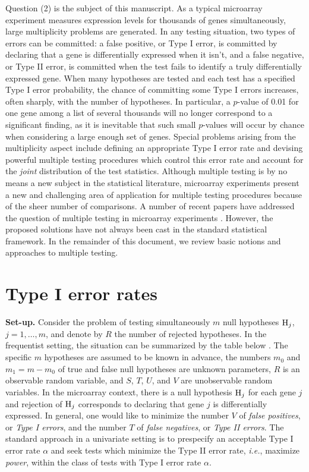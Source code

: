 \documentclass[11pt]{article}
\begin{document}
Question (2) is the subject of this manuscript. 
As a typical microarray
experiment measures expression levels for thousands of genes
simultaneously, large multiplicity problems are generated. In any
testing situation, two types of errors can be committed: a false
positive, or Type I error, is committed by declaring that a gene is
differentially expressed when it isn't, and a false negative, or Type
II error, is committed when the test fails to identify a truly
differentially expressed gene. When many hypotheses are tested and
each test has a specified Type I error probability, the chance of
committing some Type I errors increases, often sharply, with the
number of hypotheses. In particular, a $p$-value of 0.01 for one gene among a list
of several thousands will no longer correspond to a significant
finding, as it is inevitable that such small $p$-values will occur by chance when 
considering a large enough set of genes. Special problems arising from the multiplicity
aspect include defining an appropriate Type I error rate and devising
powerful multiple testing procedures which control this error rate and
account for the {\it joint} distribution of the test statistics. 
Although multiple testing is by no means a new subject in the
statistical literature, microarray experiments present a new and
challenging area of application for multiple testing procedures
because of the sheer number of comparisons. A
number of recent papers have addressed the question of multiple
testing in microarray experiments \citep{DudoitetalSinica02,Efronetal01,Golubetal,Manduchietal00,Tusheretal,Westfalletal01}. However, the proposed solutions have not always been cast in the standard statistical framework. In the remainder of this
document, we review basic notions and approaches to multiple testing.


\section{Type I error rates}\label{sTypeI}

{\bf Set-up.} Consider the problem of testing simultaneously $m$ null hypotheses ${\rm H}_j$, $j=1,\ldots,m$, and denote by $R$ the number of rejected hypotheses. In the frequentist setting, the situation can be summarized by the table below \citep{Benjamini&Hochberg95}. The specific $m$ hypotheses are assumed to be known in advance, the
numbers $m_0$ and $m_1 = m-m_0$ of true and false null hypotheses are unknown parameters, $R$ is
an observable random variable, and $S$, $T$, $U$, and $V$ are unobservable random variables. In the microarray context, there is a null hypothesis ${\rm H}_j$ for each gene $j$ and rejection of ${\rm H}_j$ corresponds to declaring that gene $j$ is differentially expressed. In general, one would like to minimize the number $V$ of {\it false positives}, or {\it Type I errors}, and the number $T$ of {\it false negatives}, or {\it Type II errors}. The standard approach in a univariate setting is to prespecify an acceptable Type I error rate $\alpha$ and seek tests which minimize the Type II error rate, {\it i.e.}, maximize {\it power}, within the class of tests with Type I error rate $\alpha$. 
\end{document}
